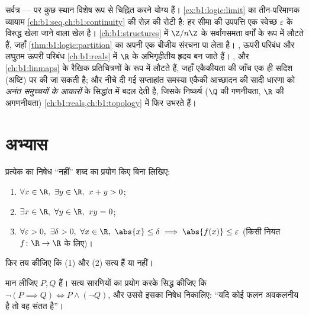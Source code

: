 \begin{remark}[यह अध्याय कहाँ काम आता है]\label{rem:b1:logic:whereused}
सर्वत्र --- पर कुछ स्थान विशेष रूप से चिह्नित करने योग्य हैं।
\cref{ex:b1:logic:limit} का तीन-परिमाणक व्यायाम
\cref{ch:b1:seq,ch:b1:continuity} की रोज़ की रोटी है: हर सीमा की उपपत्ति एक
स्वेच्छ $\varepsilon$ के विरुद्ध खेला जाने वाला खेल है। 
\cref{ch:b1:structures} में $\Z/n\Z$ के सर्वांगसमता वर्गों के रूप में लौटते
हैं, जहाँ \cref{thm:b1:logic:partition} का  अपनी एक बीजीय संरचना पा
लेता है। , ऊपरी परिबंध और लघुतम ऊपरी परिबंध \cref{ch:b1:reals} में
$\R$ के अभिगृहीतीय हृदय बन जाते हैं। ,  और 
 \cref{ch:b1:linmaps} के रैखिक प्रतिचित्रणों के रूप में लौटते
हैं, जहाँ एकैकीयता की जाँच एक ही सदिश (अष्टि) पर की जा सकती है; और नीचे दी
गई सप्ताहांत समस्या एकैकी आच्छादन की सादी धारणा को \emph{अनंत समुच्चयों के
आकारों} के सिद्धांत में बदल देती है, जिसके निष्कर्ष ($\Q$ की गणनीयता, $\R$
की अगणनीयता) \cref{ch:b1:reals,ch:b1:topology} में फिर उभरते हैं।
\end{remark}

\section{अभ्यास}

\begin{exercise}[$\star$]\label{exo:b1:logic:1}
प्रत्येक  का निषेध ``नहीं'' शब्द का प्रयोग किए बिना लिखिए:
\begin{enumerate}
  \item $\forall x \in \R,\ \exists y \in \R,\ x + y > 0$;
  \item $\exists x \in \R,\ \forall y \in \R,\ xy = 0$;
  \item $\forall \varepsilon > 0,\ \exists \delta > 0,\ \forall x \in
        \R,\ \abs{x} \leq \delta \implies \abs{f(x)} \leq \varepsilon$
(किसी नियत  $f \colon \R \to \R$ के लिए)।
\end{enumerate}
फिर तय कीजिए कि  (1) और (2) सत्य हैं या नहीं।
\end{exercise}

\begin{exercise}[$\star$]\label{exo:b1:logic:2}
मान लीजिए $P, Q$  हैं। सत्य सारणियों का प्रयोग करके सिद्ध कीजिए कि
$\lnot(P \implies Q) \iff P \land (\lnot Q)$, और उससे इसका निषेध निकालिए:
``यदि कोई फलन अवकलनीय है तो वह संतत है''।
\end{exercise}

